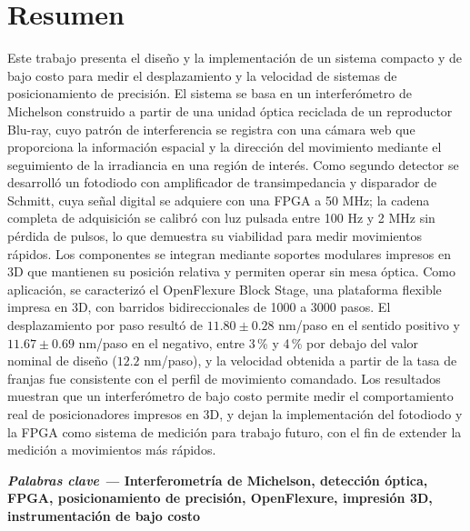 \pagestyle{fancy}
\section*{Resumen}
Este trabajo presenta el diseño y la implementación de un sistema compacto y de bajo costo para medir el desplazamiento y la velocidad de sistemas de posicionamiento de precisión. El sistema se basa en un interferómetro de Michelson construido a partir de una unidad óptica reciclada de un reproductor Blu-ray, cuyo patrón de interferencia se registra con una cámara web que proporciona la información espacial y la dirección del movimiento mediante el seguimiento de la irradiancia en una región de interés. Como segundo detector se desarrolló un fotodiodo con amplificador de transimpedancia y disparador de Schmitt, cuya señal digital se adquiere con una FPGA a 50 MHz; la cadena completa de adquisición se calibró con luz pulsada entre 100 Hz y 2 MHz sin pérdida de pulsos, lo que demuestra su viabilidad para medir movimientos rápidos. Los componentes se integran mediante soportes modulares impresos en 3D que mantienen su posición relativa y permiten operar sin mesa óptica. Como aplicación, se caracterizó el OpenFlexure Block Stage, una plataforma flexible impresa en 3D, con barridos bidireccionales de 1000 a 3000 pasos. El desplazamiento por paso resultó de $11.80 \pm 0.28$ nm/paso en el sentido positivo y $11.67 \pm 0.69$ nm/paso en el negativo, entre 3\,\% y 4\,\% por debajo del valor nominal de diseño ($12.2$ nm/paso), y la velocidad obtenida a partir de la tasa de franjas fue consistente con el perfil de movimiento comandado. Los resultados muestran que un interferómetro de bajo costo permite medir el comportamiento real de posicionadores impresos en 3D, y dejan la implementación del fotodiodo y la FPGA como sistema de medición para trabajo futuro, con el fin de extender la medición a movimientos más rápidos.



\vspace{1cm}\textbf{\textit{Palabras clave ---} Interferometría de Michelson, detección óptica, FPGA, posicionamiento de precisión, OpenFlexure, impresión 3D, instrumentación de bajo costo}


